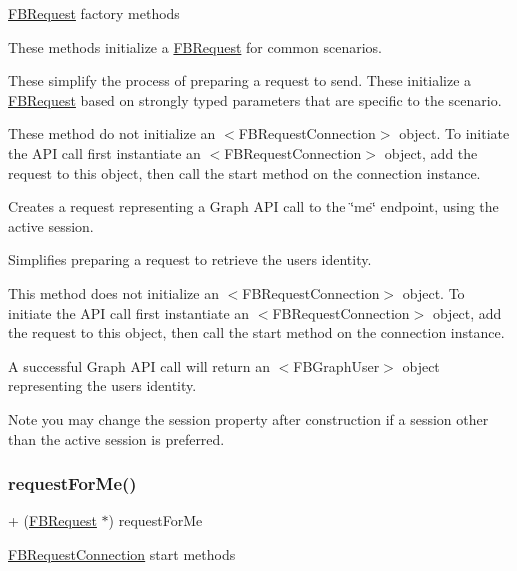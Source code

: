 \hyperlink{interfaceFBRequest}{F\+B\+Request} factory methods

These methods initialize a {\ttfamily \hyperlink{interfaceFBRequest}{F\+B\+Request}} for common scenarios.

These simplify the process of preparing a request to send. These initialize a {\ttfamily \hyperlink{interfaceFBRequest}{F\+B\+Request}} based on strongly typed parameters that are specific to the scenario.

These method do not initialize an $<$\+F\+B\+Request\+Connection$>$ object. To initiate the A\+PI call first instantiate an $<$\+F\+B\+Request\+Connection$>$ object, add the request to this object, then call the {\ttfamily start} method on the connection instance.

Creates a request representing a Graph A\+PI call to the \char`\"{}me\char`\"{} endpoint, using the active session.

Simplifies preparing a request to retrieve the user\textquotesingle{}s identity.

This method does not initialize an $<$\+F\+B\+Request\+Connection$>$ object. To initiate the A\+PI call first instantiate an $<$\+F\+B\+Request\+Connection$>$ object, add the request to this object, then call the {\ttfamily start} method on the connection instance.

A successful Graph A\+PI call will return an $<$\+F\+B\+Graph\+User$>$ object representing the user\textquotesingle{}s identity.

Note you may change the session property after construction if a session other than the active session is preferred. \mbox{\label{interfaceFBRequest_a1a8fb083c2d09cbbc5ae9afd33e2381f}} 
\subsubsection{\texorpdfstring{request\+For\+Me()}{requestForMe()}\hspace{0.1cm}{\footnotesize\ttfamily [5/5]}}
{\footnotesize\ttfamily + (\hyperlink{interfaceFBRequest}{F\+B\+Request} $\ast$) request\+For\+Me \begin{DoxyParamCaption}{ }\end{DoxyParamCaption}}

\hyperlink{interfaceFBRequestConnection}{F\+B\+Request\+Connection} start methods

